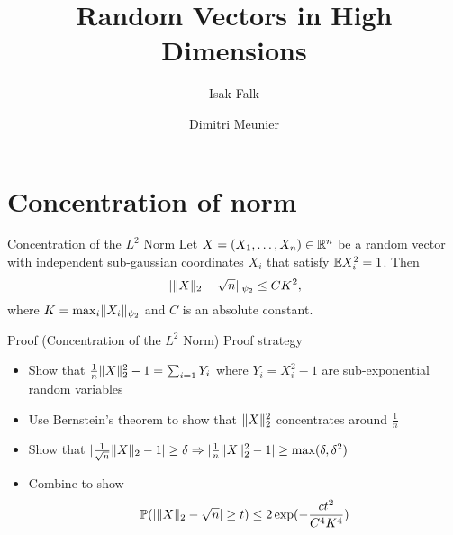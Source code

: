 \documentclass{beamer}
\title{Random Vectors in High Dimensions}
\author{Isak Falk \and Dimitri Meunier}
\institute{IIT}
\begin{document}
  \maketitle
  \section{Concentration of norm}
  \begin{frame}{Concentration of the \(L^{2}\) Norm}
      Let \(X = (X_{1}, \dots, X_{n}) \in \mathbb{R}^{n}\) be a random vector with independent
      sub-gaussian coordinates \(X_{i}\) that satisfy \(\mathbb{E} X_{i}^{2} = 1\). Then
      \begin{equation}
        \lVert\lVert X\rVert_{2} - \sqrt{n}\rVert_{\psi_{2}} \leq CK^{2},
      \end{equation}
      where \(K = \max_{i} \lVert X_{i}\rVert_{\psi_{2}}\) and \(C\) is an absolute
      constant.
  \end{frame}

  \begin{frame}{Proof (Concentration of the \(L^{2}\) Norm)}
    Proof strategy\pause
    \begin{itemize}
      \item Show that \(\frac{1}{n}\lVert X\rVert_{2}^{2} - 1 = \sum_{i=1}Y_{i} \)
        where \(Y_{i} = X_{i}^{2} - 1\) are sub-exponential random variables\pause
      \item Use Bernstein's theorem to show that \(\lVert X\rVert_{2}^{2}\)
        concentrates around \(\frac{1}{n}\)\pause
      \item Show that
        \(\lvert\frac{1}{\sqrt{n}}\lVert X\rVert_{2} - 1\rvert \geq \delta \Rightarrow \lvert\frac{1}{n}\lVert X\rVert_{2}^{2} - 1\rvert \geq \max(\delta, \delta^{2})\)\pause
      \item Combine to show
        \begin{equation}
          \mathbb{P}(\lvert\lVert X\rVert_{2} - \sqrt{n}\rvert \geq t) \leq 2 \exp(-\frac{ct^{2}}{C^{4}K^{4}})
        \end{equation}
    \end{itemize}
  \end{frame}
\end{document}
